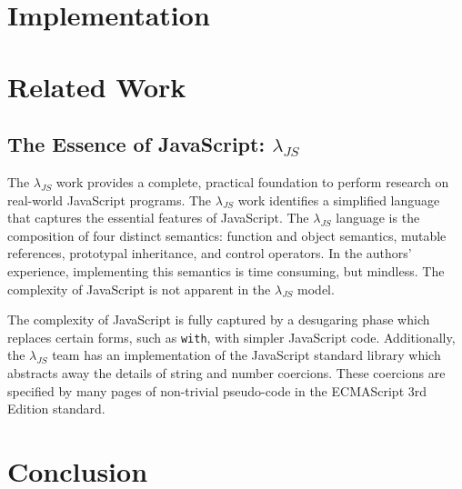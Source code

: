 \documentclass[10pt,letter,english]{article}
\newcommand{\js}[0]{JavaScript}
\newcommand{\lambdajs}[0]{$\lambda_{JS}$}
\begin{document}
\section{Implementation}



\section{Related Work}



\subsection{The Essence of JavaScript: \lambdajs{}}

The \lambdajs{} work provides a complete, practical foundation to perform
research on real-world JavaScript programs. The \lambdajs{} work identifies a
simplified language that captures the essential features of \js{}. The
\lambdajs{} language is the composition of four distinct semantics: function and
object semantics, mutable references, prototypal inheritance, and control
operators. In the authors' experience, implementing this semantics is time
consuming, but mindless. The complexity of \js{} is not apparent in the
\lambdajs{} model.

The complexity of \js{} is fully captured by a desugaring phase which replaces
certain forms, such as \texttt{with}, with simpler \js{} code. Additionally, the
\lambdajs{} team has an implementation of the \js{} standard library which
abstracts away the details of string and number coercions. These coercions are
specified by many pages of non-trivial pseudo-code in the ECMAScript 3rd Edition
standard.

\section{Conclusion}



{}

\end{document}
